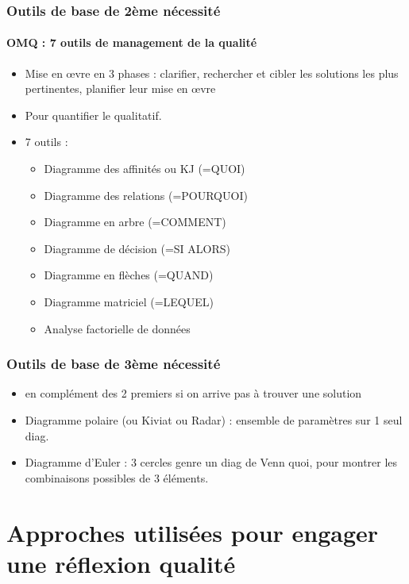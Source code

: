 			\subsubsection{Outils de base de 2ème nécessité}
				\paragraph{OMQ : 7 outils de management de la qualité}
				\begin{itemize}
				\item Mise en \oe{}vre en 3 phases : clarifier, rechercher et cibler les solutions les plus pertinentes, planifier leur mise en \oe{}vre
				\item Pour quantifier le qualitatif. 
				\item 7 outils : 
					\begin{itemize}
					\item Diagramme des affinités ou KJ (=QUOI)
					\item Diagramme des relations (=POURQUOI)
					\item Diagramme en arbre (=COMMENT)
					\item Diagramme de décision (=SI ALORS) 
					\item Diagramme en flèches (=QUAND) 
					\item Diagramme matriciel (=LEQUEL)
					\item Analyse factorielle de données
					\end{itemize}
				\end{itemize}
			\subsubsection{Outils de base de 3ème nécessité}
				\begin{itemize}
				\item en complément des 2 premiers si on arrive pas à trouver une solution 
				\item Diagramme polaire (ou Kiviat ou Radar) : ensemble de paramètres sur 1 seul diag. 
				\item Diagramme d'Euler : 3 cercles genre un diag de Venn quoi, pour montrer les combinaisons possibles de 3 éléments. 
				\end{itemize}
					
	
	\section{Approches utilisées pour engager une réflexion qualité}

